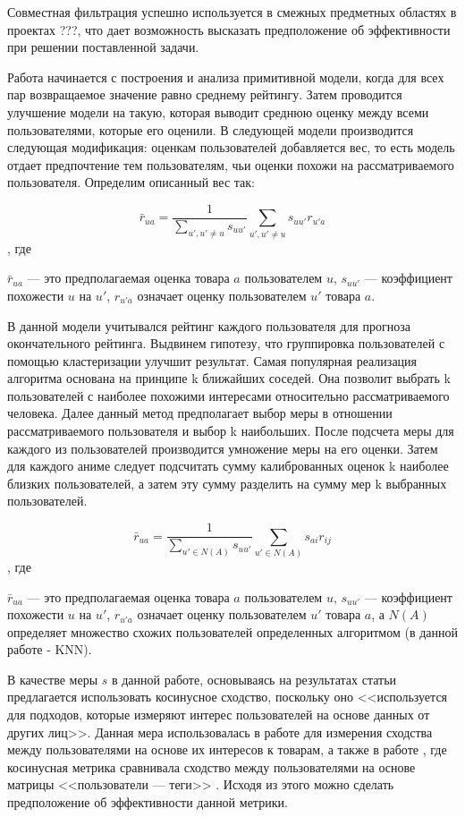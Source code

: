 \documentclass[bachelor, och, diploma]{SCWorks}
\begin{document}
Совместная фильтрация успешно используется в смежных предметных областях в проектах ???, что дает возможность высказать предположение об эффективности при решении поставленной задачи.

Работа начинается с построения и анализа примитивной модели, когда для всех пар возвращаемое значение равно среднему рейтингу. Затем проводится улучшение модели на такую, которая выводит среднюю оценку между всеми пользователями, которые его оценили. В следующей модели производится следующая модификация: оценкам пользователей добавляется вес, то есть модель отдает предпочтение тем пользователям, чьи оценки похожи на рассматриваемого пользователя. Определим описанный вес так:

$$\bar r_{ua} = \frac{1}{\sum_{u', u' \neq u} s_{uu'}}  \sum_{u', u' \neq u} s_{uu'}r_{u'a}$$, где 

$\bar r_{ua}$ --- это предполагаемая оценка товара $a$ пользователем $u$, $s_{uu'}$ --- коэффициент похожести $u$ на $u'$, $r_{u'a}$ означает оценку пользователем $u'$ товара $a$.

В данной модели учитывался рейтинг каждого пользователя для прогноза окончательного рейтинга. Выдвинем гипотезу, что группировка пользователей с помощью кластеризации улучшит результат. Самая популярная реализация алгоритма основана на принципе k ближайших соседей. Она позволит выбрать k пользователей с наиболее похожими интересами относительно рассматриваемого человека. Далее данный метод предполагает выбор меры в отношении рассматриваемого пользователя и выбор k наибольших. После подсчета меры для каждого из пользователей производится умножение меры на его оценки. Затем для каждого аниме следует подсчитать сумму калиброванных оценок k наиболее близких пользователей, а затем эту сумму разделить на сумму мер k выбранных пользователей. 

$$\bar r_{ua} = \frac{1}{\sum_{u' \in N(A)} s_{uu'}}  \sum_{u' \in N(A)} s_{ai}r_{ij}$$, где 

$\bar r_{ua}$ --- это предполагаемая оценка товара $a$ пользователем $u$, $s_{uu'}$ --- коэффициент похожести $u$ на $u'$, $r_{u'a}$ означает оценку пользователем $u'$ товара $a$, а $N(A)$ определяет множество схожих пользователей определенных алгоритмом (в данной работе - KNN).

В качестве меры $s$ в данной работе, основываясь на результатах статьи 
\cite{moghaddam2014review} предлагается использовать косинусное сходство,
 поскольку оно <<используется для подходов, которые измеряют интерес
  пользователей на основе данных от других лиц>>. Данная мера использовалась 
  в работе \cite{moghaddam2014agetrust} для измерения сходства между 
  пользователями на основе их интересов к товарам, а также в работе
   \cite{jin2012trust}, где косинусная метрика сравнивала сходство между
    пользователями на основе матрицы <<пользователи --- теги>> . Исходя из 
    этого можно сделать предположение об эффективности данной метрики.
\end{document}
